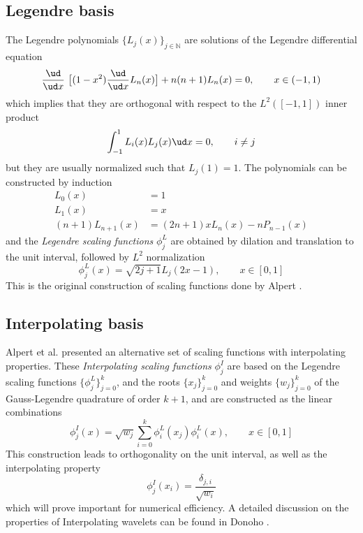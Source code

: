\subsection*{Legendre basis}
The Legendre polynomials $\lbrace L_j(x)\rbrace_{j\in \mathbb{N}}$ are solutions
of the Legendre differential equation
\begin{equation}
    \frac{\ud}{\ud x} \big[(1-x^2) \frac{\ud}{\ud x} L_n(x)\big]
	+n(n+1)L_n(x) = 0,\qquad x \in (-1,1)
\end{equation}
which implies that they are orthogonal with respect to the $L^2([-1,1])$ inner product
\begin{equation}
    \int_{-1}^{1} L_i(x)L_j(x) \ud x = 0, \qquad i \neq j
\end{equation}
but they are usually normalized such that $L_j(1) = 1$. The polynomials can be constructed 
by induction
\begin{align}
    L_0(x) &= 1\\
    L_1(x) &= x\\
    (n+1)L_{n+1}(x) &= (2n+1)xL_n(x) - nP_{n-1}(x)
\end{align}
and the \emph{Legendre scaling functions} $\phi_j^L$ are obtained by dilation 
and translation to the unit interval, followed by $L^2$ normalization
\begin{equation}    
    \phi_j^L(x) = \sqrt{2j+1}L_j(2x-1),\qquad x \in [0,1]
\end{equation}
This is the original construction of scaling functions done by Alpert \cite{Alpert93}.

\subsection*{Interpolating basis}
Alpert et al. \cite{Alpert02} presented an alternative set of scaling functions 
with interpolating properties. These \emph{Interpolating scaling functions} 
$\phi_j^I$ are based on the Legendre scaling functions $\lbrace \phi_j^L
\rbrace_{j=0}^k$, and the roots $\lbrace x_j\rbrace_{j=0}^k$ and weights
$\lbrace w_j \rbrace_{j=0}^k$ of the Gauss-Legendre quadrature of order 
$k+1$, and are constructed as the linear combinations
\begin{equation}
    \label{eq:interpolating}
    \phi_j^I(x) = \sqrt{w_j}\sum_{i=0}^{k} \phi_i^L(x_j)\phi_i^L(x),\qquad x \in [0,1]
\end{equation}
This construction leads to orthogonality on the unit interval, as well as the 
interpolating property
\begin{equation}
    \label{eq:interprop}
    \phi_j^I(x_i) = \frac{\delta_{j,i}}{\sqrt{w_i}}
\end{equation}
which will prove important for numerical efficiency. A detailed discussion on 
the properties of Interpolating wavelets can be found in Donoho \cite{Donoho}.


